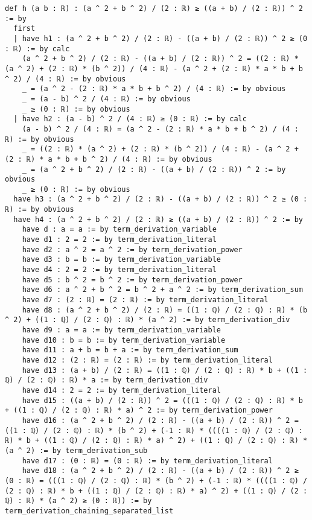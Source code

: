 \documentclass{article}
\begin{document}
\begin{tcolorbox}[colback=white!10, width=\linewidth]
\begin{lstlisting}[language=Lean4]
def h (a b : ℝ) : (a ^ 2 + b ^ 2) / (2 : ℝ) ≥ ((a + b) / (2 : ℝ)) ^ 2 := by
  first
  | have h1 : (a ^ 2 + b ^ 2) / (2 : ℝ) - ((a + b) / (2 : ℝ)) ^ 2 ≥ (0 : ℝ) := by calc
    (a ^ 2 + b ^ 2) / (2 : ℝ) - ((a + b) / (2 : ℝ)) ^ 2 = ((2 : ℝ) * (a ^ 2) + (2 : ℝ) * (b ^ 2)) / (4 : ℝ) - (a ^ 2 + (2 : ℝ) * a * b + b ^ 2) / (4 : ℝ) := by obvious
    _ = (a ^ 2 - (2 : ℝ) * a * b + b ^ 2) / (4 : ℝ) := by obvious
    _ = (a - b) ^ 2 / (4 : ℝ) := by obvious
    _ ≥ (0 : ℝ) := by obvious
  | have h2 : (a - b) ^ 2 / (4 : ℝ) ≥ (0 : ℝ) := by calc
    (a - b) ^ 2 / (4 : ℝ) = (a ^ 2 - (2 : ℝ) * a * b + b ^ 2) / (4 : ℝ) := by obvious
    _ = ((2 : ℝ) * (a ^ 2) + (2 : ℝ) * (b ^ 2)) / (4 : ℝ) - (a ^ 2 + (2 : ℝ) * a * b + b ^ 2) / (4 : ℝ) := by obvious
    _ = (a ^ 2 + b ^ 2) / (2 : ℝ) - ((a + b) / (2 : ℝ)) ^ 2 := by obvious
    _ ≥ (0 : ℝ) := by obvious
  have h3 : (a ^ 2 + b ^ 2) / (2 : ℝ) - ((a + b) / (2 : ℝ)) ^ 2 ≥ (0 : ℝ) := by obvious
  have h4 : (a ^ 2 + b ^ 2) / (2 : ℝ) ≥ ((a + b) / (2 : ℝ)) ^ 2 := by
    have d : a = a := by term_derivation_variable
    have d1 : 2 = 2 := by term_derivation_literal
    have d2 : a ^ 2 = a ^ 2 := by term_derivation_power
    have d3 : b = b := by term_derivation_variable
    have d4 : 2 = 2 := by term_derivation_literal
    have d5 : b ^ 2 = b ^ 2 := by term_derivation_power
    have d6 : a ^ 2 + b ^ 2 = b ^ 2 + a ^ 2 := by term_derivation_sum
    have d7 : (2 : ℝ) = (2 : ℝ) := by term_derivation_literal
    have d8 : (a ^ 2 + b ^ 2) / (2 : ℝ) = ((1 : ℚ) / (2 : ℚ) : ℝ) * (b ^ 2) + ((1 : ℚ) / (2 : ℚ) : ℝ) * (a ^ 2) := by term_derivation_div
    have d9 : a = a := by term_derivation_variable
    have d10 : b = b := by term_derivation_variable
    have d11 : a + b = b + a := by term_derivation_sum
    have d12 : (2 : ℝ) = (2 : ℝ) := by term_derivation_literal
    have d13 : (a + b) / (2 : ℝ) = ((1 : ℚ) / (2 : ℚ) : ℝ) * b + ((1 : ℚ) / (2 : ℚ) : ℝ) * a := by term_derivation_div
    have d14 : 2 = 2 := by term_derivation_literal
    have d15 : ((a + b) / (2 : ℝ)) ^ 2 = (((1 : ℚ) / (2 : ℚ) : ℝ) * b + ((1 : ℚ) / (2 : ℚ) : ℝ) * a) ^ 2 := by term_derivation_power
    have d16 : (a ^ 2 + b ^ 2) / (2 : ℝ) - ((a + b) / (2 : ℝ)) ^ 2 = ((1 : ℚ) / (2 : ℚ) : ℝ) * (b ^ 2) + (-1 : ℝ) * ((((1 : ℚ) / (2 : ℚ) : ℝ) * b + ((1 : ℚ) / (2 : ℚ) : ℝ) * a) ^ 2) + ((1 : ℚ) / (2 : ℚ) : ℝ) * (a ^ 2) := by term_derivation_sub
    have d17 : (0 : ℝ) = (0 : ℝ) := by term_derivation_literal
    have d18 : (a ^ 2 + b ^ 2) / (2 : ℝ) - ((a + b) / (2 : ℝ)) ^ 2 ≥ (0 : ℝ) = (((1 : ℚ) / (2 : ℚ) : ℝ) * (b ^ 2) + (-1 : ℝ) * ((((1 : ℚ) / (2 : ℚ) : ℝ) * b + ((1 : ℚ) / (2 : ℚ) : ℝ) * a) ^ 2) + ((1 : ℚ) / (2 : ℚ) : ℝ) * (a ^ 2) ≥ (0 : ℝ)) := by term_derivation_chaining_separated_list

\end{lstlisting}
\end{tcolorbox}
\end{document}
